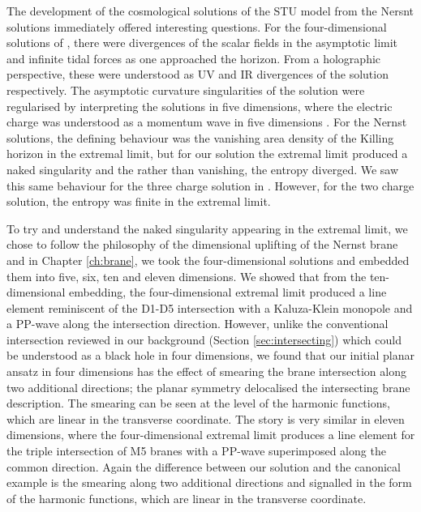 The development of the cosmological solutions of the STU model from the Nersnt solutions immediately offered interesting questions. For the four-dimensional solutions of \cite{Dempster:2015}, there were divergences of the scalar fields in the asymptotic limit and infinite tidal forces as one approached the horizon. From a holographic perspective, these were understood as UV and IR divergences of the solution respectively. The asymptotic curvature singularities of the solution were regularised by interpreting the solutions in five dimensions, where the electric charge was understood as a momentum wave in five dimensions \cite{Dempster:2016}. For the Nernst solutions, the defining behaviour was the vanishing area density of the Killing horizon in the extremal limit, but for our solution the extremal limit produced a naked singularity and the rather than vanishing, the entropy diverged. We saw this same behaviour for the three charge solution in \cite{Gutowski:2019iyo}. However, for the two charge solution, the entropy was finite in the extremal limit.

To try and understand the naked singularity appearing in the extremal limit, we chose to follow the philosophy of the dimensional uplifting of the Nernst brane and in Chapter \ref{ch:brane}, we took the four-dimensional solutions and embedded them into five, six, ten and eleven dimensions. We showed that from the ten-dimensional embedding, the four-dimensional extremal limit produced a line element reminiscent of the D1-D5 intersection with a Kaluza-Klein monopole and a PP-wave along the intersection direction. However, unlike the conventional intersection reviewed in our background (Section \ref{sec:intersecting}) which could be understood as a black hole in four dimensions, we found that our initial planar ansatz in four dimensions has the effect of smearing the brane intersection along two additional directions; the planar symmetry delocalised the intersecting brane description. The smearing can be seen at the level of the harmonic functions, which are linear in the transverse coordinate. The story is very similar in eleven dimensions, where the four-dimensional extremal limit produces a line element for the triple intersection of M5 branes with a PP-wave superimposed along the common direction. Again the difference between our solution and the canonical example is the smearing along two additional directions and signalled in the form of the harmonic functions, which are linear in the transverse coordinate.

